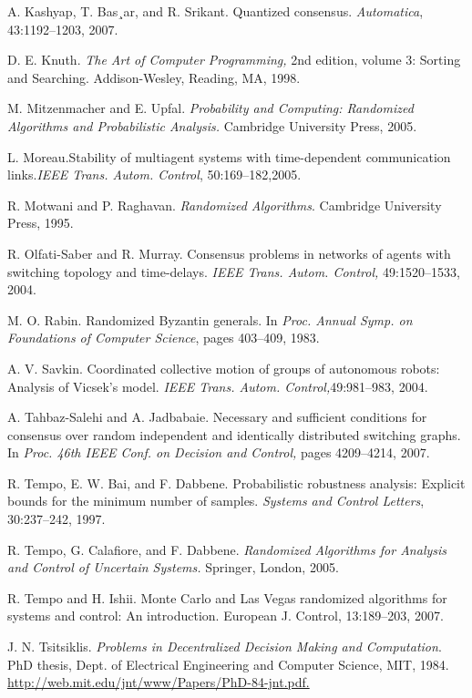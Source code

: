 \documentclass[12pt]{article}
\begin{document}
\begin{thebibliography}{30}
		
		 A. Kashyap, T. Bas¸ar, and R. Srikant. Quantized consensus. \textit{Automatica}, 43:1192–1203, 2007.
		
		
		 D. E. Knuth. \textit{The Art of Computer Programming,} 2nd edition, volume 3: Sorting and Searching. Addison-Wesley, Reading, MA, 1998.
		
		
		 M. Mitzenmacher and E. Upfal. \textit{Probability and Computing: Randomized Algorithms and Probabilistic Analysis.} Cambridge University Press, 2005.
		
		
		 L. Moreau.Stability of multiagent systems with time-dependent communication links.\textit{IEEE Trans. Autom. Control}, 50:169–182,2005.
		
		
		 R. Motwani and P. Raghavan. \textit{Randomized Algorithms}. Cambridge University Press, 1995.
		
		
		 R. Olfati-Saber and R. Murray. Consensus problems in networks of agents with switching topology and time-delays. \textit{IEEE Trans. Autom. Control,} 49:1520–1533, 2004.
		
		
		 M. O. Rabin. Randomized Byzantin generals. In \textit{Proc. Annual Symp. on Foundations of Computer Science}, pages 403–409, 1983.
		
		
		 A. V. Savkin. Coordinated collective motion of groups of autonomous robots: Analysis of Vicsek’s model. \textit{IEEE Trans. Autom. Control,}49:981–983, 2004.
		
		
		 A. Tahbaz-Salehi and A. Jadbabaie. Necessary and sufficient conditions for consensus over random independent and identically distributed switching graphs. In \textit{Proc. 46th IEEE Conf. on Decision and Control,} pages 4209–4214, 2007.
		
		
		 R. Tempo, E. W. Bai, and F. Dabbene. Probabilistic robustness analysis: Explicit bounds for the minimum number of samples. \textit{Systems and Control Letters}, 30:237–242, 1997.
		
		
		  R. Tempo, G. Calafiore, and F. Dabbene. \textit{Randomized Algorithms for Analysis and Control of Uncertain Systems.} Springer, London, 2005.
		
		
		 R. Tempo and H. Ishii. Monte Carlo and Las Vegas randomized algorithms for systems and control: An introduction. European J. Control, 13:189–203, 2007.
		
		
		 J. N. Tsitsiklis. \textit{Problems in Decentralized Decision Making and Computation}. PhD thesis, Dept. of Electrical Engineering and Computer Science, MIT, 1984. \href{http://web.mit.edu/jnt/www/Papers/PhD-84-jnt.pdf.}{http://web.mit.edu/jnt/www/Papers/PhD-84-jnt.pdf.}
		

\end{thebibliography}
\end{document}
